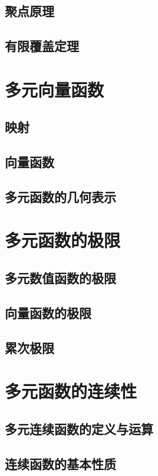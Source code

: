\subsection{聚点原理}
\subsection{有限覆盖定理}
\begin{exercise}
\item
\end{exercise}
\section{多元向量函数}
\subsection{映\emspace 射}
\subsection{向量函数}
\subsection{多元函数的几何表示}
\begin{exercise}
\item
\end{exercise}
\section{多元函数的极限}
\subsection{多元数值函数的极限}
\subsection{向量函数的极限}
\subsection{累次极限}
\begin{exercise}
\item
\end{exercise}
\section{多元函数的连续性}
\subsection{多元连续函数的定义与运算}
\subsection{连续函数的基本性质}
\begin{exercise}
\item
\end{exercise}
\begin{exercise*}
\item
\end{exercise*}




\endinput
